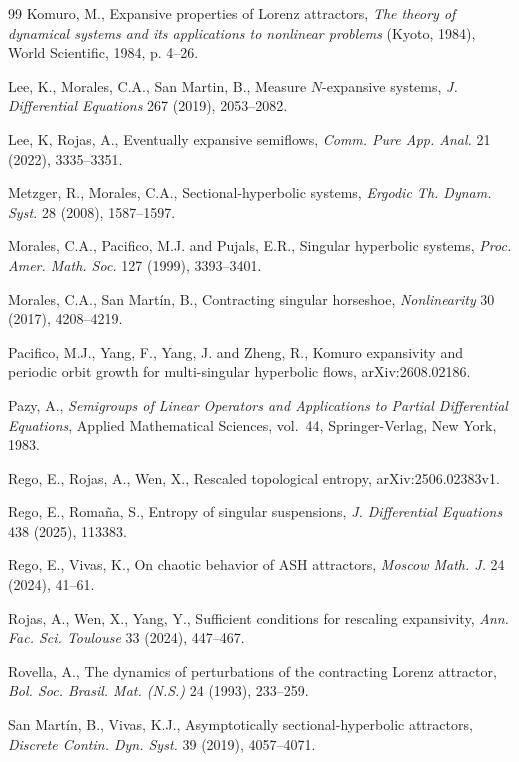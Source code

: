 \documentclass[11pt,reqno]{amsart}
\theoremstyle{definition}
\theoremstyle{remark}
\begin{document}
\begin{thebibliography}{99}
Komuro, M.,
Expansive properties of Lorenz attractors,
\emph{The theory of dynamical systems and its applications to nonlinear problems} (Kyoto, 1984), World Scientific, 1984, p. 4--26.

Lee, K., Morales, C.A., San Martin, B.,
Measure $N$-expansive systems,
{\em J. Differential Equations} 267 (2019), 2053--2082.

Lee, K, Rojas, A.,
Eventually expansive semiflows,
{\em Comm. Pure App. Anal.} 21 (2022), 3335--3351.



Metzger, R., Morales, C.A.,
Sectional-hyperbolic systems,
\emph{Ergodic Th. Dynam. Syst.} 28 (2008), 1587--1597.


Morales, C.A., Pacifico, M.J. and Pujals, E.R.,
Singular hyperbolic systems,
\emph{Proc. Amer. Math. Soc.} 127 (1999),
3393--3401.

Morales, C.A., San Mart\'{i}n, B.,
Contracting singular horseshoe,
\emph{Nonlinearity} 30 (2017), 4208--4219.



Pacifico, M.J., Yang, F., Yang, J. and Zheng, R.,
Komuro expansivity and periodic orbit growth for multi-singular hyperbolic flows,
arXiv:2608.02186.


Pazy, A.,
\textit{Semigroups of Linear Operators and Applications to Partial Differential Equations},
Applied Mathematical Sciences, vol.~44, Springer-Verlag, New York, 1983.

Rego, E., Rojas, A., Wen, X.,
Rescaled topological entropy,
arXiv:2506.02383v1.



Rego, E., Roma\~na, S.,
Entropy of singular suspensions,
\emph{J. Differential Equations} 438 (2025), 113383.

Rego, E., Vivas, K.,
On chaotic behavior of ASH attractors,
\emph{Moscow Math. J.} 24 (2024), 41--61.


Rojas, A., Wen, X., Yang, Y.,
Sufficient conditions for rescaling expansivity,
\emph{Ann. Fac. Sci. Toulouse} 33 (2024), 447--467.

Rovella, A.,
The dynamics of perturbations of the contracting Lorenz
attractor,
\emph{Bol. Soc. Brasil. Mat. (N.S.)} 24 (1993), 233--259.



San Martín, B., Vivas, K.J.,
Asymptotically sectional-hyperbolic attractors,
\emph{Discrete Contin. Dyn. Syst.} 39 (2019), 4057--4071.


\end{thebibliography}
\end{document}
